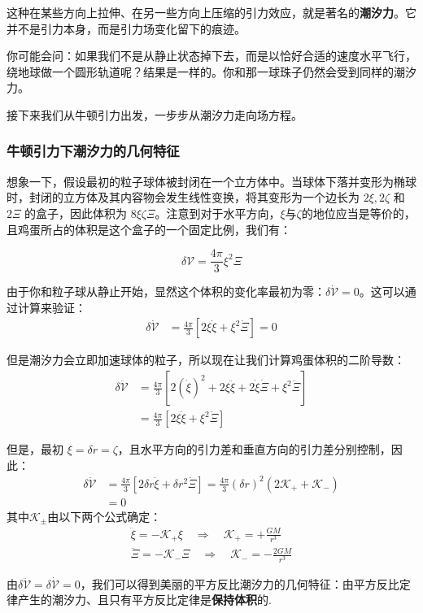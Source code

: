 \documentclass{article}
\begin{document}
这种在某些方向上拉伸、在另一些方向上压缩的引力效应，就是著名的\textbf{潮汐力}。它并不是引力本身，而是引力场变化留下的痕迹。

你可能会问：如果我们不是从静止状态掉下去，而是以恰好合适的速度水平飞行，绕地球做一个圆形轨道呢？结果是一样的。你和那一球珠子仍然会受到同样的潮汐力。

接下来我们从牛顿引力出发，一步步从潮汐力走向场方程。

\subsubsection{牛顿引力下潮汐力的几何特征}

想象一下，假设最初的粒子球体被封闭在一个立方体中。当球体下落并变形为椭球时，封闭的立方体及其内容物会发生线性变换，将其变形为一个边长为 $2\xi, 2\zeta$ 和 $2\Xi$ 的盒子，因此体积为 $8\xi\zeta\Xi$。注意到对于水平方向，$\xi$与$\zeta$的地位应当是等价的，且鸡蛋所占的体积是这个盒子的一个固定比例，我们有：

\begin{equation*}
\delta \mathcal{V} = \frac{4\pi}{3} \xi^2 \Xi
\end{equation*}

由于你和粒子球从静止开始，显然这个体积的变化率最初为零：$\delta \dot{\mathcal{V}} = 0$。这可以通过计算来验证：
\begin{align*}
\delta \dot{\mathcal{V}} &= \frac{4\pi}{3} \left[ 2\xi \dot{\xi} + \xi^2 \dot{\Xi} \right] = 0
\end{align*}

但是潮汐力会立即加速球体的粒子，所以现在让我们计算鸡蛋体积的二阶导数：
\begin{align*}
\delta \ddot{\mathcal{V}} &= \frac{4\pi}{3} \left[ 2(\dot{\xi})^2 + 2\xi \ddot{\xi} + 2\dot{\xi} \dot{\Xi} + \xi^2 \ddot{\Xi} \right] \\
&= \frac{4\pi}{3} \left[ 2\xi \ddot{\xi} + \xi^2 \ddot{\Xi} \right]
\end{align*}

但是，最初 $\xi = \delta r = \zeta$，且水平方向的引力差和垂直方向的引力差分别控制，因此：
\begin{align*}
\delta \ddot{\mathcal{V}} &= \frac{4\pi}{3} \left[ 2\delta r \ddot{\xi} + \delta r^2 \ddot{\Xi} \right] = \frac{4\pi}{3} (\delta r)^2 \left( 2\mathcal{K}_+ + \mathcal{K}_- \right) \\
&= {0}
\end{align*}
其中$\mathcal K_{\pm}$由以下两个公式确定：
\begin{gather*}
    \ddot{\xi} = -\mathcal{K}_+ \xi \quad \Rightarrow \quad \mathcal{K}_+ = +\frac{GM}{r^3}\\
    \ddot{\Xi} = -\mathcal{K}_- \Xi \quad \Rightarrow \quad \mathcal{K}_- = -\frac{2GM}{r^3}
\end{gather*}

由$\delta\ddot{\mathcal V}=\delta\dot{\mathcal V}=0$，我们可以得到美丽的平方反比潮汐力的几何特征：由平方反比定律产生的潮汐力、且只有平方反比定律是\textbf{保持体积}的.
\end{document}
